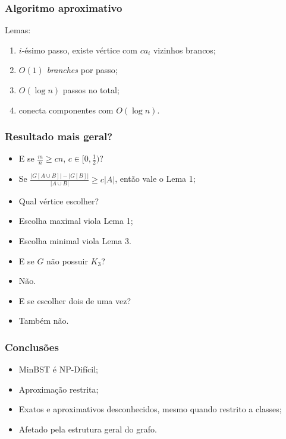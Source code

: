 \documentclass[14pt]{beamer}
\begin{document}
\begin{frame}
  \frametitle{Algoritmo aproximativo}
  Lemas:
  \begin{enumerate}
    \item $i$-ésimo passo, existe vértice com $ca_i$ vizinhos brancos;
    \item $O(1)$ \emph{branches} por passo;
    \item $O(\log n)$ passos no total;
    \item conecta componentes com $O(\log n)$.
  \end{enumerate}
\end{frame}

\begin{frame}
  \frametitle{Resultado mais geral?}
  \begin{itemize}
    \item<1> E se $\frac{m}{n} \ge cn$, $c \in [0, \frac{1}{2})$?
    \item<1> Se $\frac{|G[A \cup B]| - |G[B]|}{|A \cup B|} \ge c|A|$, então vale o Lema 1;
    \item<1> Qual vértice escolher?
    \item<1,3,5> Escolha maximal viola Lema 1;
    \item<1,3,5> Escolha minimal viola Lema 3.
    \item<2,3> E se $G$ não possuir $K_3$?
    \item<3> Não.
    \item<4-> E se escolher dois de uma vez?
    \item<5> Também não.
  \end{itemize}
\end{frame}

\begin{frame}
  \frametitle{Conclusões}
  \begin{itemize}
    \item MinBST é NP-Difícil;
    \item Aproximação restrita;
    \item Exatos e aproximativos desconhecidos, mesmo quando restrito a classes;
    \item Afetado pela estrutura geral do grafo.
  \end{itemize}
\end{frame}
\end{document}

